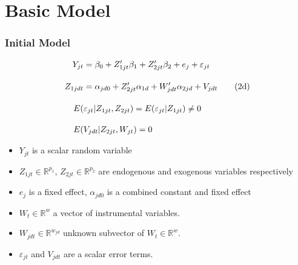 \documentclass[9pt]{beamer}
\begin{document}
\section{Basic Model} 



\begin{frame} 
\frametitle{Initial Model} 

\begin{align} 
Y_{jt} &= \beta_0 + Z_{1jt}'\beta_1 + Z_{2jt}'\beta_2 + e_j + \varepsilon_{jt} \\[10pt]
%
Z_{1jdt} &= \alpha_{jd0} + Z_{2jt}' \alpha_{1d} + W_{jdt}' \alpha_{2jd} + V_{jdt} \tag{2d} \\[10pt]
%
\addtocounter {equation} {1}
E(&\varepsilon_{jt} | Z_{1jt} , Z_{2jt}) = E(\varepsilon_{jt} | Z_{1jt}) \neq 0  \\[10pt]
%
E(& V_{jdt} | Z_{2jt},W_{jt}) = 0 
%
\end{align}

\begin{itemize} \addtolength{\itemsep}{\baselineskip}
	    \item $Y_{jt}$ is a scalar random variable
	    \item $ Z_{1jt} \in \mathbb{R}^{p_1}$, $ Z_{2jt} \in \mathbb{R}^{p_2}$ are endogenous and exogenous variables respectively
	    \item $e_j$ is a fixed effect, $\alpha_{jd0}$ is a combined constant and fixed effect
	    \item $ W_{t} \in \mathbb{R}^w$ a vector of instrumental variables.
	    \item $W_{jdt} \in \mathbb{R}^{w_{jd}}$ unknown subvector of $W_t \in \mathbb{R}^w$. 	    \item $\varepsilon_{jt}$ and $V_{jdt}$ are a scalar error terms.
\end{itemize} 

\end{frame}
\end{document}
